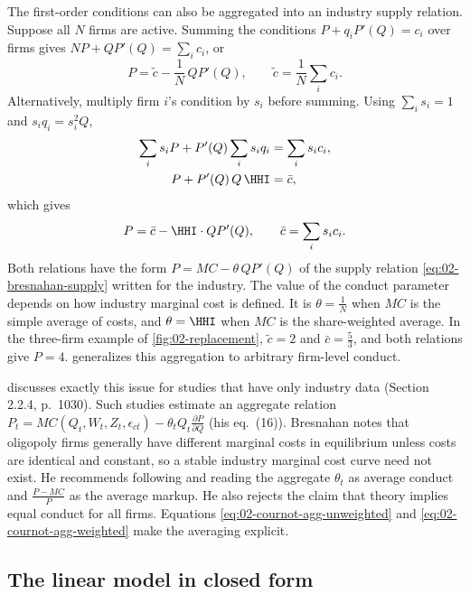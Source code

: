 The first-order conditions can also be aggregated into an industry supply relation. Suppose all $N$ firms are
active. Summing the conditions $P + q_iP'(Q) = c_i$ over firms gives $NP + QP'(Q) = \sum_i c_i$, or
\begin{equation}\label{eq:02-cournot-agg-unweighted}
  P = \tilde c - \frac{1}{N}\,QP'(Q), \qquad \tilde c = \frac{1}{N}\sum_i c_i .
\end{equation}
Alternatively, multiply firm $i$'s condition by $s_i$ before summing. Using $\sum_i s_i = 1$ and $s_iq_i = s_i^2Q$,
\begin{align*}
  \sum_i s_iP + P'(Q)\sum_i s_iq_i &= \sum_i s_ic_i, \\
  P + P'(Q)\,Q\,\HHI &= \bar c,
\end{align*}
which gives
\begin{equation}\label{eq:02-cournot-agg-weighted}
  P = \bar c - \HHI\cdot QP'(Q), \qquad \bar c = \sum_i s_ic_i .
\end{equation}
Both relations have the form $P = MC - \theta\,QP'(Q)$ of the supply relation \eqref{eq:02-bresnahan-supply}
written for the industry. The value of the conduct parameter depends on how industry marginal cost is defined. It is
$\theta = \frac{1}{N}$ when $MC$ is the simple average of costs, and $\theta = \HHI$ when $MC$ is the share-weighted
average. In the three-firm example of \cref{fig:02-replacement}, $\tilde c = 2$ and $\bar c = \frac{5}{3}$, and both
relations give $P = 4$.  generalizes this aggregation to arbitrary firm-level conduct.

\citet{Bresnahan1989} discusses exactly this issue for studies that have only industry data (Section 2.2.4,
p.~1030). Such studies estimate an aggregate relation $P_t = MC(Q_t, W_t, Z_t, \epsilon_{ct}) - \theta_t
Q_t\frac{\partial P}{\partial Q}$ (his eq.~(16)). Bresnahan notes that oligopoly firms generally have different
marginal costs in equilibrium unless costs are identical and constant, so a stable industry marginal cost curve
need not exist. He recommends following \citet{CowlingWaterson1976} and reading the aggregate $\theta_t$ as average
conduct and $\frac{P - MC}{P}$ as the average markup. He also rejects the claim that theory implies equal conduct
for all firms. Equations \eqref{eq:02-cournot-agg-unweighted} and \eqref{eq:02-cournot-agg-weighted} make the
averaging explicit.

\subsection{The linear model in closed form}\label{sec:02-cournot-linear}

